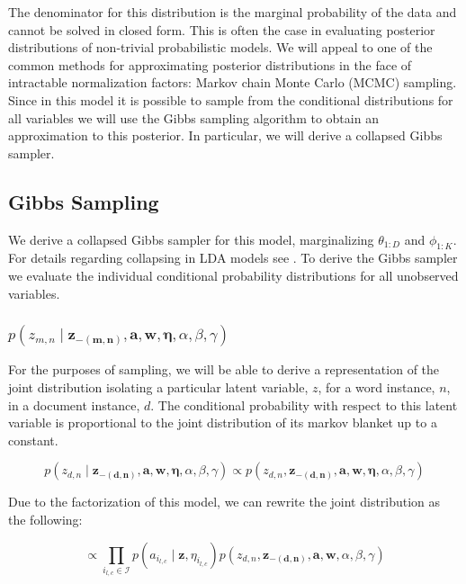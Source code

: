 \documentclass{article}
\begin{document}
The denominator for this distribution is the marginal probability
of the data and cannot be solved in closed form. This is often the
case in evaluating posterior distributions of non-trivial probabilistic
models. We will appeal to one of the common methods for approximating
posterior distributions in the face of intractable normalization factors:
Markov chain Monte Carlo (MCMC) sampling. Since in this model it is
possible to sample from the conditional distributions for all variables
we will use the Gibbs sampling algorithm to obtain an approximation
to this posterior. In particular, we will derive a collapsed Gibbs
sampler.


\subsection{Gibbs Sampling}

We derive a collapsed Gibbs sampler for this model, marginalizing
$\theta_{1:D}$ and $\phi_{1:K}$. For details regarding collapsing
in LDA models see \citet{Griffiths04}. To derive the Gibbs sampler
we evaluate the individual conditional probability distributions for
all unobserved variables.


\subsubsection{$p\left(z_{m,n}\mid\mathbf{z_{-\left(m,n\right)}},\mathbf{a},\mathbf{w},\mathbf{\eta},\alpha,\beta,\gamma\right)$}

For the purposes of sampling, we will be able to derive a representation
of the joint distribution isolating a particular latent variable,
$z$, for a word instance, $n$, in a document instance, $d$. The
conditional probability with respect to this latent variable is proportional
to the joint distribution of its markov blanket up to a constant.

\begin{equation}
p\left(z_{d,n}\mid\mathbf{z_{-\left(d,n\right)}},\mathbf{a},\mathbf{w},\mathbf{\eta},\alpha,\beta,\gamma\right)\propto p\left(z_{d,n},\mathbf{z_{-\left(d,n\right)}},\mathbf{a},\mathbf{w},\mathbf{\eta},\alpha,\beta,\gamma\right)\end{equation}


Due to the factorization of this model, we can rewrite the joint distribution
as the following:

\begin{equation}
\propto\prod_{i_{l,c}\in\mathcal{I}}p\left(a_{i_{l,c}}\mid\mathbf{z},\eta_{i_{l,c}}\right)p\left(z_{d,n},\mathbf{z_{-\left(d,n\right)}},\mathbf{a},\mathbf{w},\alpha,\beta,\gamma\right)\end{equation}
\end{document}
